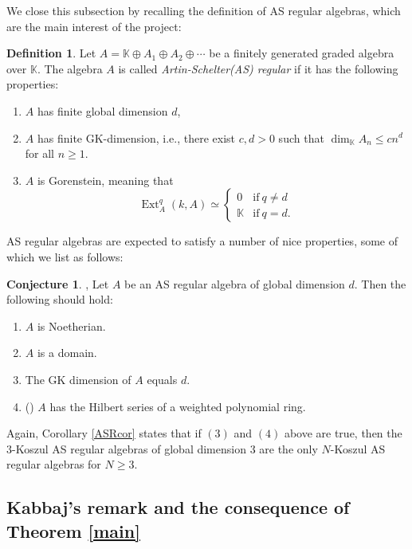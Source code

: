 \documentclass[reqno]{amsart}
\newcommand{\bbK}{\mathbb{K}}
\DeclareMathOperator{\ext}{Ext}
\numberwithin{equation}{section}
\theoremstyle{plain}
\theoremstyle{definition}
\newtheorem{de}[equation]{Definition}
\newtheorem{conj}{Conjecture}
\begin{document}

We close this subsection by recalling the definition of AS regular algebras, which are the main interest of the project:

\begin{de}\cite{RogalskiAS}
    Let $A=\bbK\oplus A_1\oplus A_2\oplus\cdots$ be a finitely generated graded algebra over $\bbK$. The algebra $A$ is called \emph{Artin-Schelter(AS) regular} if it has the following properties:
    \begin{enumerate}
        \item $A$ has finite global dimension $d$, 
        \item $A$ has finite GK-dimension, i.e., there exist $c, d>0$ such that $\dim_\bbK A_n\leq cn^d$ for all $n\geq1$.
        \item $A$ is Gorenstein, meaning that
        $$\ext^q_A(k, A)\simeq\left\{\begin{array}{llll}
        0 & \text{if}\ q\neq d\\
        \bbK & \text{if}\ q=d.
        \end{array}\right.$$
    \end{enumerate}
\end{de}

AS regular algebras are expected to satisfy a number of nice properties, some of which we list as follows:

\begin{conj}\cite{ArtinTateVandenBergh}, \cite{RogalskiAS}
Let $A$ be an AS regular algebra of global dimension $d$. Then the following should hold:
    \begin{enumerate}
        \item $A$ is Noetherian.
        \item $A$ is a domain.
        \item The GK dimension of $A$ equals $d.$
        \item(\cite{PositselskiPolishchuk}) $A$ has the Hilbert series of a weighted polynomial ring.
    \end{enumerate}
\end{conj}

Again, Corollary \ref{ASRcor} states that if $(3)$ and $(4)$ above are true, then the $3$-Koszul AS regular algebras of global dimension $3$ are the only $N$-Koszul AS regular algebras for $N\geq3$.

\subsection{Kabbaj's remark \cite[2.2]{Kabbaj} and the consequence of Theorem \ref{main}}\label{remarkmain}
\end{document}
